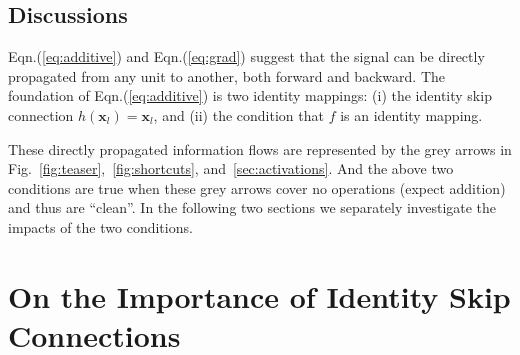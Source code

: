 \documentclass[runningheads]{llncs}
\newcommand{\ve}[1]{\mathbf{#1}} %
\begin{document}
\subsection*{Discussions}

Eqn.(\ref{eq:additive}) and Eqn.(\ref{eq:grad}) suggest that the signal can be directly propagated from any unit to another, both forward and backward.
The foundation of Eqn.(\ref{eq:additive}) is two identity mappings: (i) the identity skip connection $h(\ve{x}_{l}) = \ve{x}_{l}$, and (ii) the condition that $f$ is an identity mapping.

These directly propagated information flows are represented by the grey arrows in Fig.~\ref{fig:teaser},~\ref{fig:shortcuts}, and~\ref{sec:activations}. And the above two conditions are true when these grey arrows cover no operations (expect addition) and thus are ``clean''.
In the following two sections we separately investigate the impacts of the two conditions.


\section{On the Importance of Identity Skip Connections}
\label{sec:identityskip}
\end{document}
